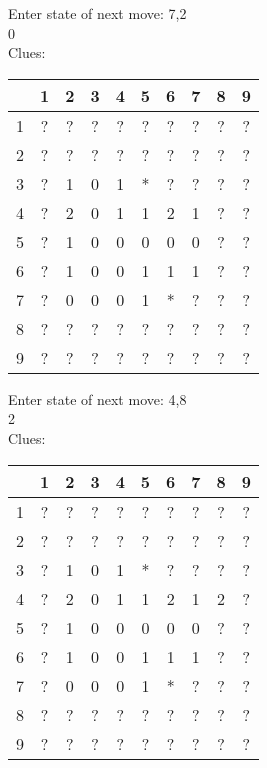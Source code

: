 Enter state of next move: 7,2\\
0\\
Clues:\\
\begin{tabular}{|c|c|c|c|c|c|c|c|c|c|}
\hline
  & 1 & 2 & 3 & 4 & 5 & 6 & 7 & 8 & 9\\
\hline
1 & ? & ? & ? & ? & ? & ? & ? & ? & ?\\
\hline
2 & ? & ? & ? & ? & ? & ? & ? & ? & ?\\
\hline
3 & ? & 1 & 0 & 1 & * & ? & ? & ? & ?\\
\hline
4 & ? & 2 & 0 & 1 & 1 & 2 & 1 & ? & ?\\
\hline
5 & ? & 1 & 0 & 0 & 0 & 0 & 0 & ? & ?\\
\hline
6 & ? & 1 & 0 & 0 & 1 & 1 & 1 & ? & ?\\
\hline
7 & ? & 0 & 0 & 0 & 1 & * & ? & ? & ?\\
\hline
8 & ? & ? & ? & ? & ? & ? & ? & ? & ?\\
\hline
9 & ? & ? & ? & ? & ? & ? & ? & ? & ?\\
\hline
\end{tabular}

Enter state of next move: 4,8\\
2\\
Clues:\\
\begin{tabular}{|c|c|c|c|c|c|c|c|c|c|}
\hline
  & 1 & 2 & 3 & 4 & 5 & 6 & 7 & 8 & 9\\
\hline
1 & ? & ? & ? & ? & ? & ? & ? & ? & ?\\
\hline
2 & ? & ? & ? & ? & ? & ? & ? & ? & ?\\
\hline
3 & ? & 1 & 0 & 1 & * & ? & ? & ? & ?\\
\hline
4 & ? & 2 & 0 & 1 & 1 & 2 & 1 & 2 & ?\\
\hline
5 & ? & 1 & 0 & 0 & 0 & 0 & 0 & ? & ?\\
\hline
6 & ? & 1 & 0 & 0 & 1 & 1 & 1 & ? & ?\\
\hline
7 & ? & 0 & 0 & 0 & 1 & * & ? & ? & ?\\
\hline
8 & ? & ? & ? & ? & ? & ? & ? & ? & ?\\
\hline
9 & ? & ? & ? & ? & ? & ? & ? & ? & ?\\
\hline
\end{tabular}

